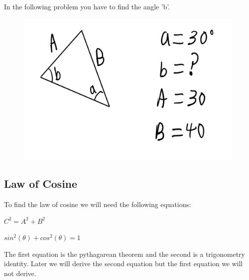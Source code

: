 \documentclass[12pt]{article}
\begin{document}
In the following problem you have to find the angle 'b'.
\begin{figure}[h]
\includegraphics[scale=0.25]{lawOfSinProb2.png}
\end{figure}

\parbox[][8cm][t]{8cm}{}

\subsection{Law of Cosine}

To find the law of cosine we will need the following equations:

$C^2 = A^2 + B^2$

$sin^2(\theta) + cos^2(\theta) = 1$

The first equation is the pythagarean theorem and the second is a trigonometry identity. Later we will derive the second equation but the first equation we will not derive.
\end{document}

